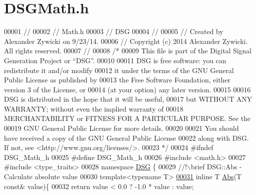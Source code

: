 \hypertarget{_d_s_g_math_8h_source}{\section{D\+S\+G\+Math.\+h}
\label{_d_s_g_math_8h_source}
}

\begin{DoxyCode}
00001 \textcolor{comment}{//}
00002 \textcolor{comment}{//  Math.h}
00003 \textcolor{comment}{//  DSG}
00004 \textcolor{comment}{//}
00005 \textcolor{comment}{//  Created by Alexander Zywicki on 9/23/14.}
00006 \textcolor{comment}{//  Copyright (c) 2014 Alexander Zywicki. All rights reserved.}
00007 \textcolor{comment}{//}
00008 \textcolor{comment}{/*}
00009 \textcolor{comment}{ This file is part of the Digital Signal Generation Project or “DSG”.}
00010 \textcolor{comment}{}
00011 \textcolor{comment}{ DSG is free software: you can redistribute it and/or modify}
00012 \textcolor{comment}{ it under the terms of the GNU General Public License as published by}
00013 \textcolor{comment}{ the Free Software Foundation, either version 3 of the License, or}
00014 \textcolor{comment}{ (at your option) any later version.}
00015 \textcolor{comment}{}
00016 \textcolor{comment}{ DSG is distributed in the hope that it will be useful,}
00017 \textcolor{comment}{ but WITHOUT ANY WARRANTY; without even the implied warranty of}
00018 \textcolor{comment}{ MERCHANTABILITY or FITNESS FOR A PARTICULAR PURPOSE.  See the}
00019 \textcolor{comment}{ GNU General Public License for more details.}
00020 \textcolor{comment}{}
00021 \textcolor{comment}{ You should have received a copy of the GNU General Public License}
00022 \textcolor{comment}{ along with DSG.  If not, see <http://www.gnu.org/licenses/>.}
00023 \textcolor{comment}{ */}
00024 \textcolor{preprocessor}{#ifndef DSG\_Math\_h}
00025 \textcolor{preprocessor}{#define DSG\_Math\_h}
00026 \textcolor{preprocessor}{#include <math.h>}
00027 \textcolor{preprocessor}{#include <type\_traits>}
00028 \textcolor{keyword}{namespace }\hyperlink{namespace_d_s_g}{DSG} \{\textcolor{comment}{}
00029 \textcolor{comment}{    //!\(\backslash\)brief DSG::Abs - Calculate absolute value}
00030 \textcolor{comment}{}    \textcolor{keyword}{template}<\textcolor{keyword}{typename} T>
\hypertarget{_d_s_g_math_8h_source_l00031}{}\hyperlink{namespace_d_s_g_a0af03bade7e25e8da80e3022af0e45a7}{00031}     \textcolor{keyword}{inline} T \hyperlink{namespace_d_s_g_a0af03bade7e25e8da80e3022af0e45a7}{Abs}(T \textcolor{keyword}{const}& value)\{
00032         \textcolor{keywordflow}{return} value < 0.0 ? -1.0 * value : value;

\end{DoxyCode}
